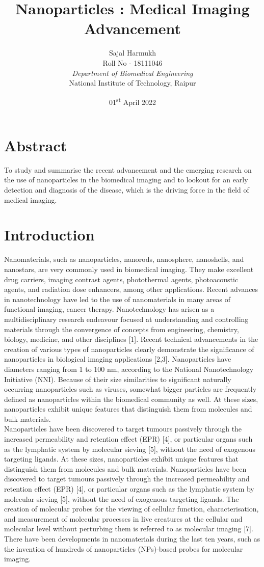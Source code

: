 \documentclass[12pt]{article}
\title{\textbf{Nanoparticles : Medical Imaging Advancement}}
\author{Sajal Harmukh \\ Roll No - 18111046 \\ \textit{Department of Biomedical Engineering} \\ National Institute of Technology, Raipur }
\date{01\textsuperscript{st} April 2022}
\begin{document}
\maketitle

\section*{Abstract}

To study and summarise the recent advancement and the emerging research on the use of nanoparticles in the biomedical imaging and to lookout for an early detection and diagnosis of the disease, which is the driving force in the field of medical imaging.

\section*{Introduction}
Nanomaterials, such as nanoparticles, nanorods, nanosphere, nanoshells, and nanostars, are very commonly used in biomedical imaging. They make excellent drug carriers, imaging contrast agents, photothermal agents, photoacoustic agents, and radiation dose enhancers, among other applications. Recent advances in nanotechnology have led to the use of nanomaterials in many areas of functional imaging, cancer therapy. Nanotechnology has arisen as a multidisciplinary research endeavour focused at understanding and controlling materials through the convergence of concepts from engineering, chemistry, biology, medicine, and other disciplines [1]. Recent technical advancements in the creation of various types of nanoparticles clearly demonstrate the significance of nanoparticles in biological imaging applications [2,3]. Nanoparticles have diameters ranging from 1 to 100 nm, according to the National Nanotechnology Initiative (NNI). Because of their size similarities to significant naturally occurring nanoparticles such as viruses, somewhat bigger particles are frequently defined as nanoparticles within the biomedical community as well. At these sizes, nanoparticles exhibit unique features that distinguish them from molecules and bulk materials.\\ Nanoparticles have been discovered to target tumours passively through the increased permeability and retention effect (EPR) [4], or particular organs such as the lymphatic system by molecular sieving [5], without the need of exogenous targeting ligands. At these sizes, nanoparticles exhibit unique features that distinguish them from molecules and bulk materials. Nanoparticles have been discovered to target tumours passively through the increased permeability and retention effect (EPR) [4], or particular organs such as the lymphatic system by molecular sieving [5], without the need of exogenous targeting ligands. The creation of molecular probes for the viewing of cellular function, characterisation, and measurement of molecular processes in live creatures at the cellular and molecular level without perturbing them is referred to as molecular imaging [7]. There have been developments in nanomaterials during the last ten years, such as the invention of hundreds of nanoparticles (NPs)-based probes for molecular imaging.
\end{document}
